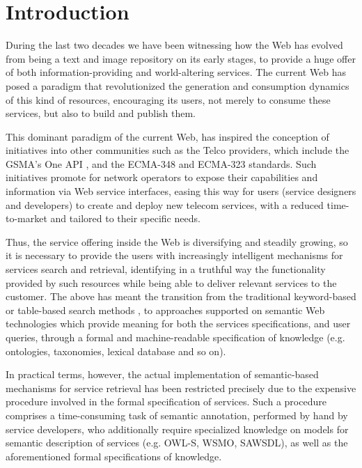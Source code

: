 \section{Introduction}
\label{sec:introduction}

\noindent During the last two decades we have been witnessing how the Web has evolved from being a text and image repository on its early stages, to provide a huge offer of both information-providing and world-altering services. The current Web has posed a paradigm that revolutionized the generation and consumption dynamics of this kind of resources, encouraging its users, not merely to consume these services, but also to build and publish them.

This dominant paradigm of the current Web, has inspired the conception of initiatives into other communities such as the Telco providers, which include the GSMA’s One API \cite{GSMA:2013}, and the ECMA-348 \cite{ECMA:2012} and ECMA-323 \cite{ECMA:2011} standards. Such initiatives promote for network operators to expose their capabilities and information via Web service interfaces, easing this way for users (service designers and developers) to create and deploy new telecom services, with a reduced time-to-market and tailored to their specific needs.

Thus, the service offering inside the Web is diversifying and steadily growing, so it is necessary to provide the users with increasingly intelligent mechanisms for services search and retrieval, identifying in a truthful way the functionality provided by such resources while being able to deliver relevant services to the customer. The above has meant the transition from the traditional keyword-based or table-based search methods \cite{Bernstein:2002}, to approaches supported on semantic Web technologies which provide meaning for both the services specifications, and user queries, through a formal and machine-readable specification of knowledge (e.g. ontologies, taxonomies, lexical database and so on).

In practical terms, however, the actual implementation of semantic-based mechanisms for service retrieval has been restricted precisely due to the expensive procedure involved in the formal specification of services. Such a procedure comprises a time-consuming task of semantic annotation, performed by hand by service developers, who additionally require specialized knowledge on models for semantic description of services (e.g. OWL-S, WSMO, SAWSDL), as well as the aforementioned formal specifications of knowledge.

